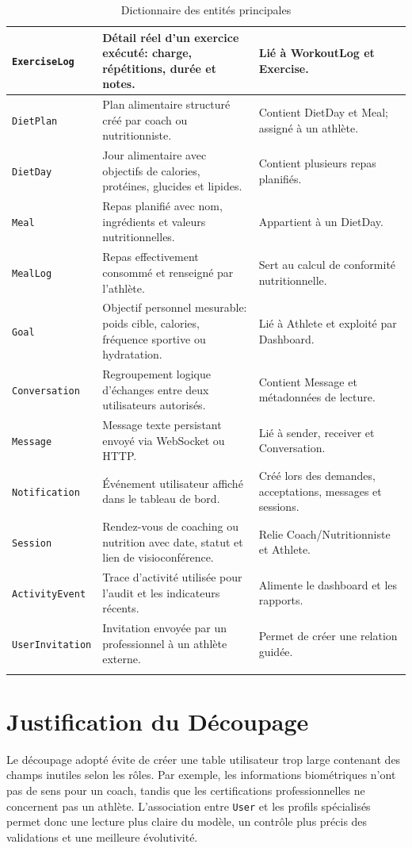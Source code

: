 \begin{longtable}{|p{3.5cm}|p{6cm}|p{6cm}|}
\texttt{ExerciseLog} & Détail réel d’un exercice exécuté: charge, répétitions, durée et notes. & Lié à WorkoutLog et Exercise. \\ \hline
\texttt{DietPlan} & Plan alimentaire structuré créé par coach ou nutritionniste. & Contient DietDay et Meal; assigné à un athlète. \\ \hline
\texttt{DietDay} & Jour alimentaire avec objectifs de calories, protéines, glucides et lipides. & Contient plusieurs repas planifiés. \\ \hline
\texttt{Meal} & Repas planifié avec nom, ingrédients et valeurs nutritionnelles. & Appartient à un DietDay. \\ \hline
\texttt{MealLog} & Repas effectivement consommé et renseigné par l’athlète. & Sert au calcul de conformité nutritionnelle. \\ \hline
\texttt{Goal} & Objectif personnel mesurable: poids cible, calories, fréquence sportive ou hydratation. & Lié à Athlete et exploité par Dashboard. \\ \hline
\texttt{Conversation} & Regroupement logique d’échanges entre deux utilisateurs autorisés. & Contient Message et métadonnées de lecture. \\ \hline
\texttt{Message} & Message texte persistant envoyé via WebSocket ou HTTP. & Lié à sender, receiver et Conversation. \\ \hline
\texttt{Notification} & Événement utilisateur affiché dans le tableau de bord. & Créé lors des demandes, acceptations, messages et sessions. \\ \hline
\texttt{Session} & Rendez-vous de coaching ou nutrition avec date, statut et lien de visioconférence. & Relie Coach/Nutritionniste et Athlete. \\ \hline
\texttt{ActivityEvent} & Trace d’activité utilisée pour l’audit et les indicateurs récents. & Alimente le dashboard et les rapports. \\ \hline
\texttt{UserInvitation} & Invitation envoyée par un professionnel à un athlète externe. & Permet de créer une relation guidée. \\ \hline
\caption{Dictionnaire des entités principales}
\end{longtable}

\section{Justification du Découpage}
Le découpage adopté évite de créer une table utilisateur trop large contenant des champs inutiles selon les rôles. Par exemple, les informations biométriques n'ont pas de sens pour un coach, tandis que les certifications professionnelles ne concernent pas un athlète. L'association entre \texttt{User} et les profils spécialisés permet donc une lecture plus claire du modèle, un contrôle plus précis des validations et une meilleure évolutivité.

